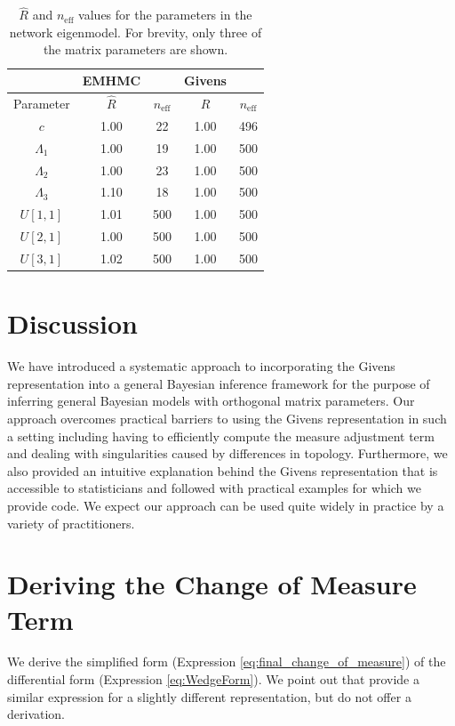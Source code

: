 \documentclass[ba]{imsart}
\numberwithin{equation}{section}
\theoremstyle{plain}
\begin{document}
\begin{table}
\begin{tabular}{|c||cc|cc|}
\hline
 & EMHMC & & Givens &\\
\hline
Parameter & $\hat{R}$ & $n_{\mathrm{eff}}$ & $\hat{R}$ & $n_{\mathrm{eff}}$\\
\hline
\hline
$c$ & 1.00 & 22 & 1.00 & 496\\
$\Lambda_1$ & 1.00 & 19 & 1.00 & 500\\
$\Lambda_2$ & 1.00 & 23 & 1.00 & 500\\
$\Lambda_3$ & 1.10 & 18 & 1.00 & 500\\
$U[1,1]$ & 1.01 & 500 & 1.00 & 500\\
$U[2,1]$ & 1.00 & 500 & 1.00 & 500\\
$U[3,1]$ & 1.02 & 500 & 1.00 & 500\\
\hline
\end{tabular}
\caption{$\hat{R}$ and $n_{\mathrm{eff}}$ values for the parameters in the network eigenmodel. For brevity, only three of the matrix parameters are shown.}
\label{tab:rhat_neff_eigennetwork}
\end{table}

\section{Discussion}\label{discussion}
We have introduced a systematic approach to incorporating the Givens representation into a general Bayesian inference framework for the purpose of inferring general Bayesian models with orthogonal matrix parameters. Our approach overcomes practical barriers to using the Givens representation in such a setting including having to efficiently compute the measure adjustment term and dealing with singularities caused by differences in topology. Furthermore, we also provided an intuitive explanation behind the Givens representation that is accessible to statisticians and followed with practical examples for which we provide code. We expect our approach can be used quite widely in practice by a variety of practitioners.

\appendix
\section{Deriving the Change of Measure Term}
We derive the simplified form (Expression \ref{eq:final_change_of_measure}) of the differential form (Expression \ref{eq:WedgeForm}). We point out that \cite{khatri1977mises} provide a similar expression for a slightly different representation, but do not offer a derivation.
\end{document}
